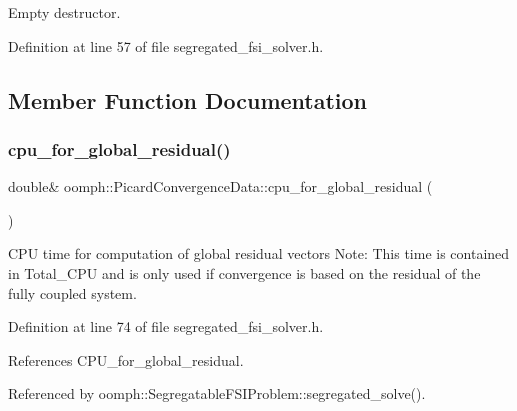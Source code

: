 Empty destructor. 



Definition at line 57 of file segregated\+\_\+fsi\+\_\+solver.\+h.



\subsection{Member Function Documentation}
\mbox{\label{classoomph_1_1PicardConvergenceData_a2e2266352cabc2b30682e0db8bf6aeb3}} 
\subsubsection{\texorpdfstring{cpu\+\_\+for\+\_\+global\+\_\+residual()}{cpu\_for\_global\_residual()}}
{\footnotesize\ttfamily double\& oomph\+::\+Picard\+Convergence\+Data\+::cpu\+\_\+for\+\_\+global\+\_\+residual (\begin{DoxyParamCaption}{ }\end{DoxyParamCaption})\hspace{0.3cm}{\ttfamily [inline]}}



C\+PU time for computation of global residual vectors Note\+: This time is contained in Total\+\_\+\+C\+PU and is only used if convergence is based on the residual of the fully coupled system. 



Definition at line 74 of file segregated\+\_\+fsi\+\_\+solver.\+h.



References C\+P\+U\+\_\+for\+\_\+global\+\_\+residual.



Referenced by oomph\+::\+Segregatable\+F\+S\+I\+Problem\+::segregated\+\_\+solve().

\mbox{\label{classoomph_1_1PicardConvergenceData_af1a46967e1e469e08b059a814dac9bf5}} 
